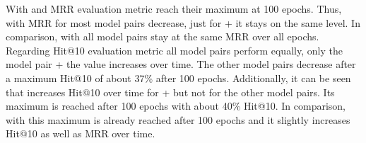 With \usmax and \ussoftmax MRR evaluation metric reach their maximum at 100 epochs. 
Thus, with \usmax MRR for most model pairs decrease, just for \complex + \transe it stays on the same level.
In comparison, with \ussoftmax all model pairs stay at the same MRR over all epochs.
Regarding Hit@10 evaluation metric all model pairs perform equally, only the model pair \complex + \transe the value increases over time.
The other model pairs decrease after a maximum Hit@10 of about 37\% after 100 epochs.
Additionally, it can be seen that \usmax increases Hit@10 over time for \complex + \transe but not for the other model pairs.
Its maximum is reached after 100 epochs with about 40\% Hit@10.
In comparison, with \ussoftmax this maximum is already reached after 100 epochs and it slightly increases Hit@10 as well as MRR over time.

